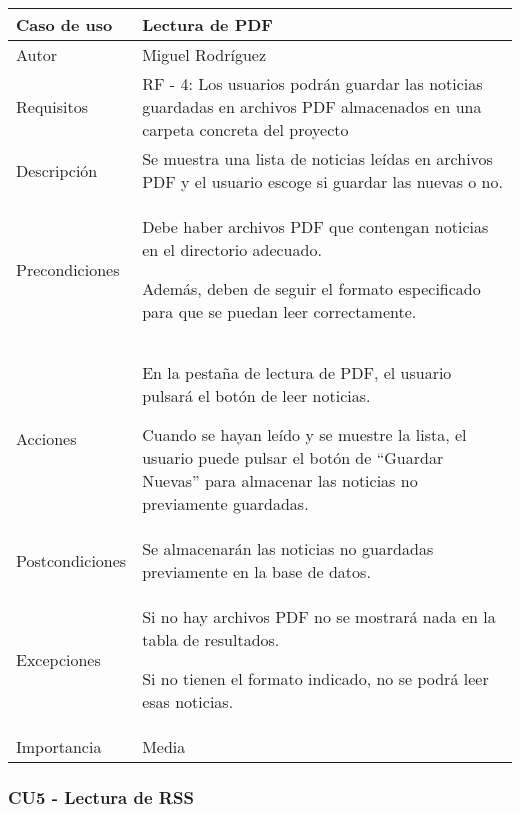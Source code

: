 \begin{center}
\begin{tabular}{ | m{3cm} | m{10cm}| } 
\hline
Caso de uso & Lectura de PDF \\ 
\hline
Autor & Miguel Rodríguez \\ 
\hline
Requisitos & RF - 4: Los usuarios podrán guardar las noticias guardadas en archivos PDF almacenados en una carpeta concreta del proyecto\\ 
\hline
Descripción & Se muestra una lista de noticias leídas en archivos PDF y el usuario escoge si guardar las nuevas o no. \\
\hline
Precondiciones & Debe haber archivos PDF que contengan noticias en el directorio adecuado. 

Además, deben de seguir el formato especificado para que se puedan leer correctamente. \\
\hline
Acciones & En la pestaña de lectura de PDF, el usuario pulsará el botón de leer noticias. 

Cuando se hayan leído y se muestre la lista, el usuario puede pulsar el botón de ``Guardar Nuevas'' para almacenar las noticias no previamente guardadas. \\
\hline
Postcondiciones & Se almacenarán las noticias no guardadas previamente en la base de datos. \\
\hline
Excepciones & Si no hay archivos PDF no se mostrará nada en la tabla de resultados. 

Si no tienen el formato indicado, no se podrá leer esas noticias. \\
\hline 
Importancia & Media \\
\hline 
\end{tabular}
\end{center}

\subsubsection{CU5 - Lectura de RSS}

